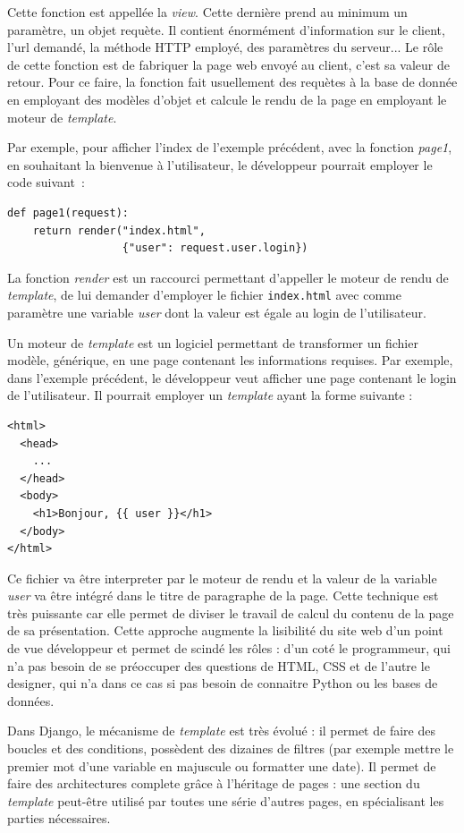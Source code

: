\documentclass[a4paper,12pt]{article}
\begin{document}
Cette fonction est appellée la \textit{view}. Cette dernière prend au minimum un paramètre,
un objet requète. Il contient énormément d'information sur le client, l'url demandé,
la méthode HTTP employé, des paramètres du serveur... Le rôle de cette fonction
est de fabriquer la page web envoyé au client, c'est sa valeur de retour. Pour ce faire,
la fonction fait usuellement des requètes à la base de donnée en employant des modèles
d'objet et calcule le rendu de la page en employant le moteur de \textit{template}.

Par exemple, pour afficher l'index de l'exemple précédent, avec la fonction \textit{page1},
en souhaitant la bienvenue à l'utilisateur, le développeur pourrait employer le code
suivant~:

\begin{verbatim}
def page1(request):
    return render("index.html",
                  {"user": request.user.login})
\end{verbatim}

La fonction \textit{render} est un raccourci permettant d'appeller le moteur
de rendu de \textit{template}, de lui demander d'employer le fichier \texttt{index.html}
avec comme paramètre une variable \textit{user} dont la valeur est égale
au login de l'utilisateur.

Un moteur de \textit{template} est un logiciel permettant de transformer un fichier
modèle, générique, en une page contenant les informations requises. Par exemple,
dans l'exemple précédent, le développeur veut afficher une page contenant le
login de l'utilisateur. Il pourrait employer un \textit{template} ayant
la forme suivante : 

\begin{verbatim}
<html>
  <head>
    ...
  </head>
  <body>
    <h1>Bonjour, {{ user }}</h1>
  </body>
</html>
\end{verbatim}

Ce fichier va être interpreter par le moteur de rendu et la valeur de la variable
\textit{user} va être intégré dans le titre de paragraphe de la page. Cette
technique est très puissante car elle permet de diviser le travail de calcul
du contenu de la page de sa présentation. Cette approche augmente la lisibilité
du site web d'un point de vue développeur et permet de scindé les rôles : d'un
coté le programmeur, qui n'a pas besoin de se préoccuper des questions
de HTML, CSS et de l'autre le designer, qui n'a dans ce cas si pas
besoin de connaitre Python ou les bases de données.

Dans Django, le mécanisme de \textit{template} est très évolué : il permet
de faire des boucles et des conditions, possèdent des dizaines de filtres (par
exemple mettre le premier mot d'une variable en majuscule ou formatter une date).
Il permet de faire des architectures complete grâce à l'héritage de pages :
une section du \textit{template} peut-être utilisé par toutes une série d'autres
pages, en spécialisant les parties nécessaires.
\end{document}
